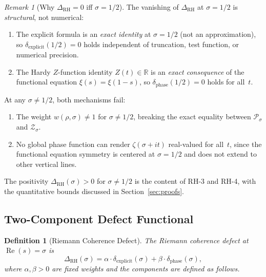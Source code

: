 \documentclass[11pt]{article}
\newtheorem{definition}[theorem]{Definition}
\theoremstyle{remark}
\newtheorem{remark}[theorem]{Remark}
\DeclareMathOperator{\Rea}{Re}
\begin{document}
\begin{remark}[Why $\Delta_{\mathrm{RH}}=0$ iff $\sigma=1/2$]
\label{rem:delta-iff}
The vanishing of $\Delta_{\mathrm{RH}}$ at $\sigma=1/2$ is \emph{structural},
not numerical:
\begin{enumerate}
  \item The explicit formula is an \emph{exact identity} at $\sigma=1/2$
    (not an approximation), so $\delta_{\mathrm{explicit}}(1/2)=0$
    holds independent of truncation, test function, or numerical precision.
  \item The Hardy $Z$-function identity $Z(t)\in\mathbb{R}$ is an \emph{exact
    consequence} of the functional equation $\xi(s)=\xi(1-s)$, so
    $\delta_{\mathrm{phase}}(1/2)=0$ holds for all~$t$.
\end{enumerate}
At any $\sigma\neq 1/2$, both mechanisms fail:
\begin{enumerate}
  \item The weight $w(\rho,\sigma)\neq 1$ for $\sigma\neq 1/2$, breaking the
    exact equality between $\mathcal{P}_\sigma$ and $\mathcal{Z}_\sigma$.
  \item No global phase function can render $\zeta(\sigma+it)$ real-valued
    for all~$t$, since the functional equation symmetry is centered at
    $\sigma=1/2$ and does not extend to other vertical lines.
\end{enumerate}
The positivity $\Delta_{\mathrm{RH}}(\sigma)>0$ for $\sigma\neq 1/2$ is
the content of RH-3 and RH-4, with the quantitative bounds discussed in
Section~\ref{sec:proofs}.
\end{remark}

\subsection{Two-Component Defect Functional}
\label{subsec:defect}

\begin{definition}[Riemann Coherence Defect]
\label{def:delta-RH}
The \emph{Riemann coherence defect} at $\Rea(s)=\sigma$ is
\begin{equation}\label{eq:delta-RH}
  \Delta_{\mathrm{RH}}(\sigma) = \alpha\cdot\delta_{\mathrm{explicit}}(\sigma)
  + \beta\cdot\delta_{\mathrm{phase}}(\sigma),
\end{equation}
where $\alpha,\beta>0$ are fixed weights and the components are defined as follows.
\end{definition}
\end{document}
